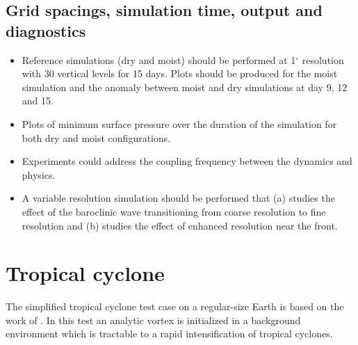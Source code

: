 \documentclass[times,doublespace]{fldauth}
\begin{document}
\subsection{Grid spacings, simulation time, output and diagnostics}

\begin{itemize}
\item Reference simulations (dry and moist) should be performed at 1$^\circ$ resolution with 30 vertical levels for 15 days.  Plots should be produced for the moist simulation and the anomaly between moist and dry simulations at day 9, 12 and 15.
\item Plots of minimum surface pressure over the duration of the simulation for both dry and moist configurations.
\item Experiments could address the coupling frequency between the dynamics and physics.
\item A variable resolution simulation should be performed that (a) studies the effect of the baroclinic wave transitioning from coarse resolution to fine resolution and (b) studies the effect of enhanced resolution near the front.
\end{itemize}

\clearpage

\section{Tropical cyclone} \label{sec:tropical_cyclone}

The simplified tropical cyclone test case on a regular-size Earth is based on the work of \cite{reed2012idealized, reed2011analytic,reed2011impact, reed2011assessing}.  In this test an analytic vortex is initialized in a background environment which is tractable to a rapid intensification of tropical cyclones.  
\end{document}
